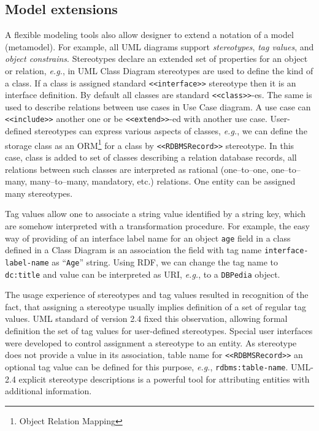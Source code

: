 \documentclass[conference]{IEEEtran}
\begin{document}

\subsection{Model extensions}
\label{sec:mod-ext}

A flexible modeling tools also allow designer to extend a notation of a model (metamodel).  For example, all UML diagrams support \emph{stereotypes}, \emph{tag values}, and \emph{object constrains}.  Stereotypes declare an extended set of properties for an object or relation, \emph{e.g.}, in UML Class Diagram stereotypes are used to define the kind of a class.  If a class is assigned standard \texttt{<<interface>>} stereotype then it is an interface definition.  By default all classes are standard \texttt{<<class>>}-es.  The same is used to describe relations between use cases in Use Case diagram.  A use case can \texttt{<<include>>} another one or be \texttt{<<extend>>}-ed with another use case.  User-defined stereotypes can express various aspects of classes, \emph{e.g.}, we can define the storage class as an ORM\footnote{Object Relation Mapping} for a class by \texttt{<<RDBMSRecord>>} stereotype.  In this case, class is added to set of classes describing a relation database records, all relations between such classes are interpreted as rational (one--to--one, one--to--many, many--to--many, mandatory, etc.) relations.  One entity can be assigned many stereotypes.

Tag values allow one to associate a string value identified by a string key, which are somehow interpreted with a transformation procedure.  For example, the easy way of providing of an interface label name for an object \texttt{age} field in a class defined in a Class Diagram is an association the field with tag name \texttt{interface-label-name} as ``\texttt{Age}'' string.  Using RDF, we can change the tag name to \texttt{dc:title} and value can be interpreted as URI, \emph{e.g.}, to a \texttt{DBPedia} object.

The usage experience of stereotypes and tag values resulted in recognition of the fact, that assigning a stereotype usually implies definition of a set of regular tag values.  UML standard of version 2.4 fixed this observation, allowing formal definition the set of tag values for user-defined stereotypes.  Special user interfaces were developed to control assignment a stereotype to an entity.  As stereotype does not provide a value in its association, table name for \texttt{<<RDBMSRecord>>} an optional tag value can be defined for this purpose, \emph{e.g.}, \texttt{rdbms:table-name}.  UML-2.4 explicit stereotype descriptions is a powerful tool for attributing entities with additional information.
\end{document}
